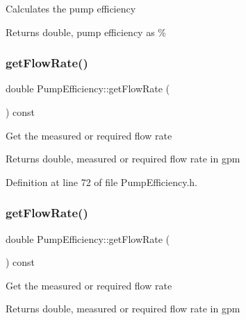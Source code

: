 Calculates the pump efficiency

\begin{DoxyReturn}{Returns}
double, pump efficiency as \% 
\end{DoxyReturn}
\mbox{\label{class_pump_efficiency_a715c4ade497e99640f09546fad6479bc}} 
\subsubsection{\texorpdfstring{get\+Flow\+Rate()}{getFlowRate()}\hspace{0.1cm}{\footnotesize\ttfamily [1/3]}}
{\footnotesize\ttfamily double Pump\+Efficiency\+::get\+Flow\+Rate (\begin{DoxyParamCaption}{ }\end{DoxyParamCaption}) const\hspace{0.3cm}{\ttfamily [inline]}}

Get the measured or required flow rate

\begin{DoxyReturn}{Returns}
double, measured or required flow rate in gpm 
\end{DoxyReturn}


Definition at line 72 of file Pump\+Efficiency.\+h.

\mbox{\label{class_pump_efficiency_a715c4ade497e99640f09546fad6479bc}} 
\subsubsection{\texorpdfstring{get\+Flow\+Rate()}{getFlowRate()}\hspace{0.1cm}{\footnotesize\ttfamily [2/3]}}
{\footnotesize\ttfamily double Pump\+Efficiency\+::get\+Flow\+Rate (\begin{DoxyParamCaption}{ }\end{DoxyParamCaption}) const\hspace{0.3cm}{\ttfamily [inline]}}

Get the measured or required flow rate

\begin{DoxyReturn}{Returns}
double, measured or required flow rate in gpm 
\end{DoxyReturn}


